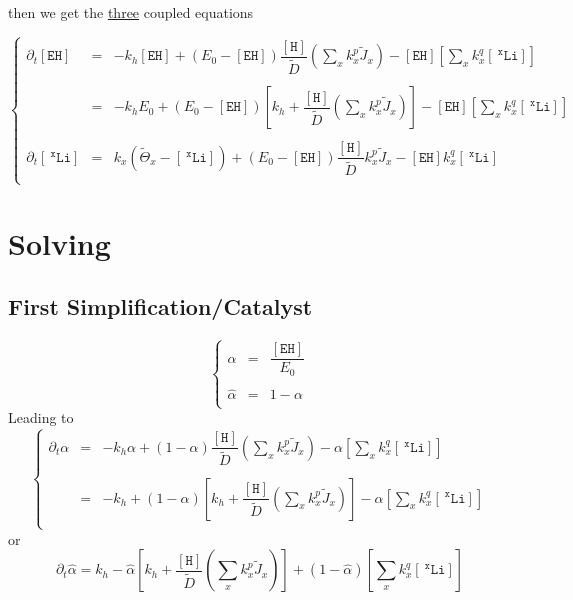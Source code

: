 \documentclass[aps,onecolumn,12pt]{revtex4}
\newcommand{\mychem}[1]{\mathtt{#1}}
\newcommand{\myconc}[1]{\left\lbrack{#1}\right\rbrack}
\newcommand{\spLi}[1]{{~^{\mychem{#1}}\mychem{Li}}}
\newcommand{\Li}[1]{\myconc{\spLi{#1}}}
\newcommand{\spEHin}{\mychem{EH}}
\newcommand{\EHin}{\myconc{\spEHin}}
\newcommand{\spproton}{\mychem{H}}
\newcommand{\proton}{\myconc{\spproton}}
\begin{document}
then we get the \underline{three} coupled equations  

\begin{equation}
\left\lbrace
	\begin{array}{rcl}
		\partial_t\EHin & = & -k_h \EHin + \left(E_0- \EHin\right) \dfrac{\proton}{\tilde{D}} \left(\sum_x k_x^p \tilde{J}_x \right)  
		- \EHin \left\lbrack {\sum_x k_x^q \Li{x}} \right\rbrack\\
		\\
		& = & 
		-k_h E_0+ \left(E_0- \EHin\right)\left\lbrack k_h+ \dfrac{\proton}{\tilde{D}} \left(\sum_x k_x^p \tilde{J}_x \right)\right] 
		- \EHin \left\lbrack {\sum_x k_x^q \Li{x}} \right\rbrack\\
		\\
		\partial_t\Li{x} & = & k_x \left(\tilde{\Theta}_x -\Li{x} \right)  + \left(E_0-\EHin\right) \dfrac{\proton}{\tilde{D}}   k_x^p \tilde{J}_x  - \EHin k_x^q \Li{x}\\
	\end{array}
\right.
\end{equation}

\section{Solving}

\subsection{First Simplification/Catalyst}
\begin{equation}
\left\lbrace
\begin{array}{rcl}
	\alpha & = & \dfrac{\EHin}{E_0}\\
	\\
	\hat\alpha & = & 1-\alpha\\
\end{array}
\right.
\end{equation}
Leading to
\begin{equation}
\left\lbrace
\begin{array}{rcl}
\partial_t\alpha & = & -k_h \alpha + \left(1- \alpha\right) \dfrac{\proton}{\tilde{D}} \left(\sum_x k_x^p \tilde{J}_x \right)  
		- \alpha \left\lbrack {\sum_x k_x^q \Li{x}} \right\rbrack\\
		\\
		& = & 
		-k_h + \left(1- \alpha\right)\left\lbrack k_h+ \dfrac{\proton}{\tilde{D}} \left(\sum_x k_x^p \tilde{J}_x \right)\right] 
		- \alpha \left\lbrack {\sum_x k_x^q \Li{x}} \right\rbrack\\\end{array}
\right.
\end{equation}
or
\begin{equation}
	\partial_t \hat\alpha = k_h - \hat\alpha \left\lbrack k_h+ \dfrac{\proton}{\tilde{D}} \left(\sum_x k_x^p \tilde{J}_x \right)\right] 
		+ (1-\hat\alpha) \left\lbrack {\sum_x k_x^q \Li{x}} \right\rbrack
\end{equation}
	
\end{document}
